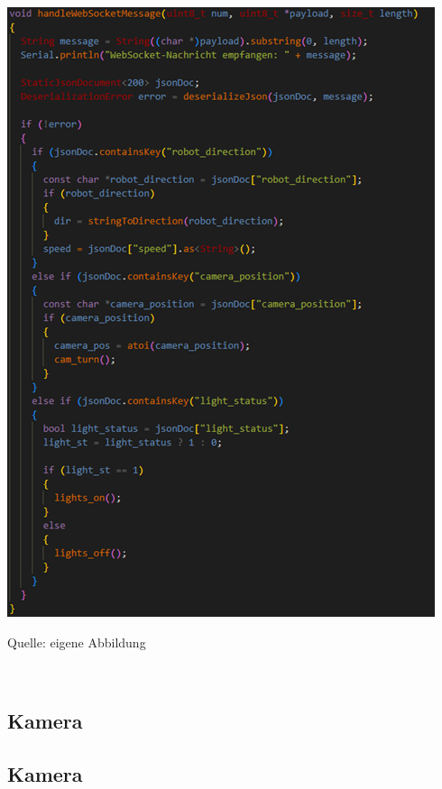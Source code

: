 \documentclass[ngerman,12pt,a4paper]{article}
\begin{document}
	\begin{center}
		\begin{minipage}[t]{0.85\textwidth}
			\includegraphics{Pictures/handlewebsocketmessage}
			\label{fig:handlewebsocketmessage}
			\vspace{-10pt}
			\begin{center}
				\par\small Quelle: eigene Abbildung 
			\end{center}
		\end{minipage} \\[0.75cm]
	\end{center}
	\subsection{Kamera}
	
		\subsection{Kamera}
		
\end{document}
